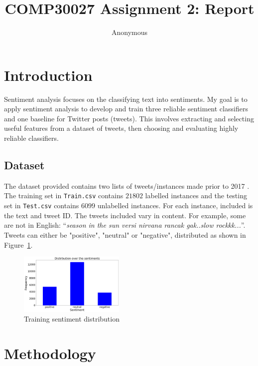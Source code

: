 \documentclass[11pt]{article}
\title{COMP30027 Assignment 2: Report}
\author
{Anonymous}
\begin{document}
\maketitle

\section{Introduction}\label{sec:intro}

Sentiment analysis focuses on the classifying text into sentiments.
My goal is to apply sentiment analysis to develop and train three reliable sentiment classifiers and one baseline for {T}witter posts (tweets).
This involves extracting and selecting useful features from a dataset of tweets, 
then choosing and evaluating highly reliable classifiers.

\subsection{Dataset}\label{sec:dataset}

The dataset provided contains two lists of tweets/instances made prior to 2017 \cite{dataset}.
The training set in \texttt{Train.csv} contains $21802$ labelled instances and the testing set in \texttt{Test.csv} contains $6099$ unlabelled instances. 
For each instance, included is the text and tweet ID. 
The tweets included vary in content.
For example, some are not in English: ``\textit{season in the sun versi nirvana rancak gak..slow rockkk...}''.
Tweets can either be "positive", "neutral" or "negative", distributed as shown in Figure~\ref{fig:sent-dist}.

\begin{figure}[H]
	\centering
	\includegraphics[width = 0.45\textwidth]{sentiment-distribution.png}
	\caption{Training sentiment distribution}
	\label{fig:sent-dist}
\end{figure} 

\section{Methodology}
\end{document}
